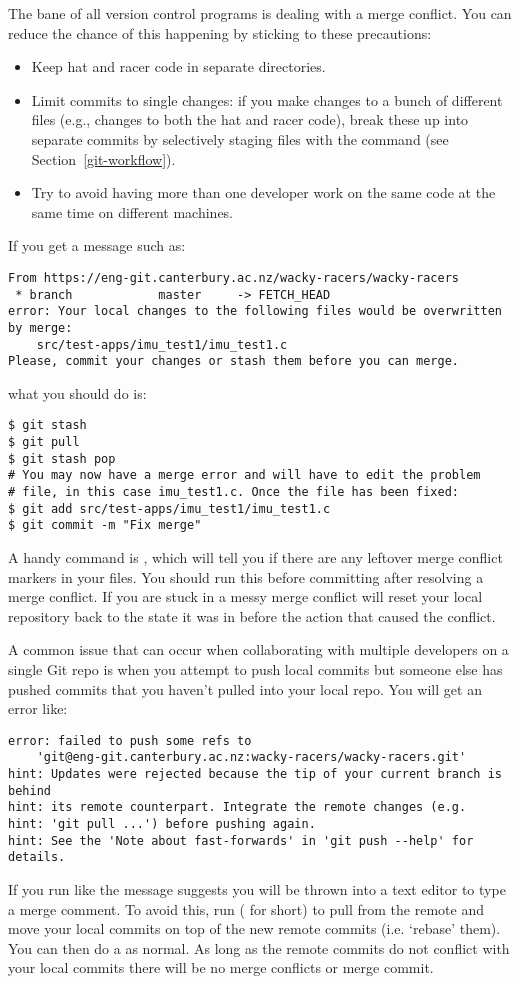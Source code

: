 The bane of all version control programs is dealing with a merge
conflict. You can reduce the chance of this happening by sticking to
these precautions:
\begin{itemize}
    \item Keep hat and racer code in separate directories.
    \item Limit commits to single changes: if you make changes to a
    bunch of different files (e.g., changes to both the hat and racer
    code), break these up into separate commits by selectively staging
    files with the  command (see
    Section~\ref{git-workflow}).
    \item Try to avoid having more than one developer work on the same
    code at the same time on different machines.
\end{itemize}

If you get a message such as:
%
\begin{verbatim}
From https://eng-git.canterbury.ac.nz/wacky-racers/wacky-racers
 * branch            master     -> FETCH_HEAD
error: Your local changes to the following files would be overwritten by merge:
    src/test-apps/imu_test1/imu_test1.c
Please, commit your changes or stash them before you can merge.
\end{verbatim}
%
what you should do is:
%
\begin{verbatim}
$ git stash
$ git pull
$ git stash pop
# You may now have a merge error and will have to edit the problem
# file, in this case imu_test1.c. Once the file has been fixed:
$ git add src/test-apps/imu_test1/imu_test1.c
$ git commit -m "Fix merge"
\end{verbatim}

A handy command is , which will tell you if
there are any leftover merge conflict markers in your files. You
should run this before committing after resolving a merge conflict. If
you are stuck in a messy merge conflict  will
reset your local repository back to the state it was in before the
action that caused the conflict.

A common issue that can occur when collaborating with multiple developers on a single Git repo is when you attempt to push local commits but someone else has pushed commits that you haven't pulled into your local repo. You will get an error like:
\begin{verbatim}
error: failed to push some refs to
    'git@eng-git.canterbury.ac.nz:wacky-racers/wacky-racers.git'
hint: Updates were rejected because the tip of your current branch is behind
hint: its remote counterpart. Integrate the remote changes (e.g.
hint: 'git pull ...') before pushing again.
hint: See the 'Note about fast-forwards' in 'git push --help' for details.
\end{verbatim}
If you run  like the message suggests you will be
thrown into a text editor to type a merge comment. To avoid this, run
 ( for short) to pull from
the remote and move your local commits on top of the new remote
commits (i.e. `rebase' them). You can then do a  as
normal. As long as the remote commits do not conflict with your local
commits there will be no merge conflicts or merge commit.

